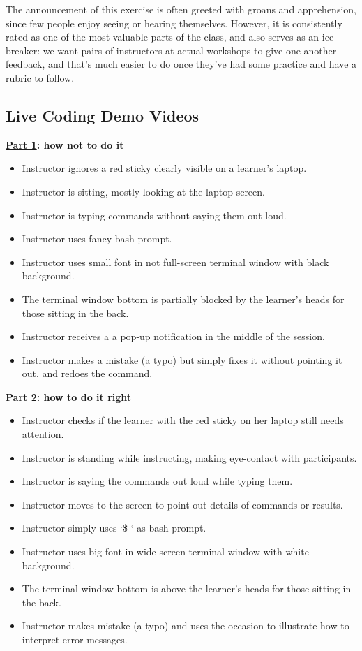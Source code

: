 The announcement of this exercise is often greeted with groans and
apprehension, since few people enjoy seeing or hearing themselves.
However, it is consistently rated as one of the most valuable parts of
the class, and also serves as an ice breaker: we want pairs of
instructors at actual workshops to give one another feedback, and that's
much easier to do once they've had some practice and have a rubric to
follow.

\subsection{Live Coding Demo Videos}\label{live-coding-demo-videos}

\textbf{\href{https://youtu.be/bXxBeNkKmJE}{Part 1}: how not to do it}

\begin{itemize}
\itemsep1pt\parskip0pt
\item
  Instructor ignores a red sticky clearly visible on a learner's laptop.
\item
  Instructor is sitting, mostly looking at the laptop screen.
\item
  Instructor is typing commands without saying them out loud.
\item
  Instructor uses fancy bash prompt.
\item
  Instructor uses small font in not full-screen terminal window with
  black background.
\item
  The terminal window bottom is partially blocked by the learner's heads
  for those sitting in the back.
\item
  Instructor receives a a pop-up notification in the middle of the
  session.
\item
  Instructor makes a mistake (a typo) but simply fixes it without
  pointing it out, and redoes the command.
\end{itemize}

\textbf{\href{https://youtu.be/SkPmwe_WjeY}{Part 2}: how to do it right}

\begin{itemize}
\itemsep1pt\parskip0pt
\item
  Instructor checks if the learner with the red sticky on her laptop
  still needs attention.
\item
  Instructor is standing while instructing, making eye-contact with
  participants.
\item
  Instructor is saying the commands out loud while typing them.
\item
  Instructor moves to the screen to point out details of commands or
  results.
\item
  Instructor simply uses `\$ ` as bash prompt.
\item
  Instructor uses big font in wide-screen terminal window with white
  background.
\item
  The terminal window bottom is above the learner's heads for those
  sitting in the back.
\item
  Instructor makes mistake (a typo) and uses the occasion to illustrate
  how to interpret error-messages.
\end{itemize}

